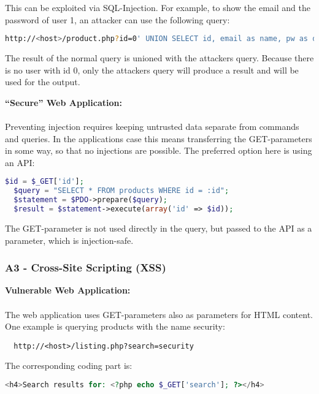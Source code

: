 This can be exploited via SQL-Injection. For example, to show the email and the password of user 1, an attacker can use the following query:

\begin{lstlisting}[language=bash]
  http://<host>/product.php?id=0' UNION SELECT id, email as name, pw as description, 'dummy' FROM users WHERE id=1 --
\end{lstlisting}

The result of the normal query is unioned with the attackers query. Because there is no user with id 0, only the attackers query will produce a result and will be used for the output.

\clearpage
\textbf{``Secure'' Web Application:}\\
\\
Preventing injection requires keeping untrusted data separate from commands and queries. In the applications case this means transferring the GET-parameters in some way, so that no injections are possible. The preferred option here is using an API:

\begin{lstlisting}[language=PHP]
  $id = $_GET['id'];
  $query = "SELECT * FROM products WHERE id = :id";
  $statement = $PDO->prepare($query);
  $result = $statement->execute(array('id' => $id));
\end{lstlisting}

The GET-parameter is not used directly in the query, but passed to the API as a parameter, which is injection-safe.


\subsubsection{A3 - Cross-Site Scripting (XSS)}

\textbf{Vulnerable Web Application:} \\
\\
The web application uses GET-parameters also as parameters for HTML content. One example is querying products with the name security:

\begin{lstlisting}
  http://<host>/listing.php?search=security
\end{lstlisting}

The corresponding coding part is:

\begin{lstlisting}[language=PHP]
  <h4>Search results for: <?php echo $_GET['search']; ?></h4>
\end{lstlisting}

